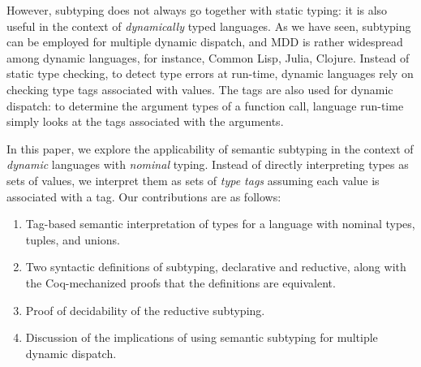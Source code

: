 However, subtyping does not always go together with static typing:
it is also useful in the context of \emph{dynamically} typed languages.
As we have seen, subtyping can be employed for multiple dynamic dispatch,
and MDD is rather widespread among dynamic languages, for instance,
Common Lisp, Julia, Clojure.
Instead of static type checking, to detect type errors at run-time,
dynamic languages rely on checking type tags associated with values.
The tags are also used for dynamic dispatch: 
to determine the argument types of a function call, 
language run-time simply looks at the tags associated with the arguments.

In this paper, we explore the applicability of semantic subtyping in 
the context of \emph{dynamic} languages with \emph{nominal} typing. 
Instead of directly interpreting types as sets of values,
we interpret them as sets of \emph{type tags} assuming 
each value is associated with a tag.
Our contributions are as follows:
\begin{enumerate}
  \item Tag-based semantic interpretation of types for a language
    with nominal types, tuples, and unions.
  \item Two syntactic definitions of subtyping, declarative and reductive,
    along with the Coq-mechanized proofs that the definitions are equivalent. 	
  \item Proof of decidability of the reductive subtyping.
  \item Discussion of the implications of using semantic subtyping
    for multiple dynamic dispatch.
\end{enumerate}






